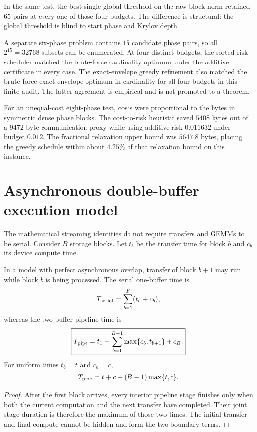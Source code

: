 In the same test, the best single global threshold on the raw block norm
retained $65$ pairs at every one of those four budgets.  The difference is
structural: the global threshold is blind to start phase and Krylov depth.

A separate six-phase problem contains $15$ candidate phase pairs, so all
$2^{15}=32768$ subsets can be enumerated.  At four distinct budgets, the
sorted-risk scheduler matched the brute-force cardinality optimum under the
additive certificate in every case.  The exact-envelope greedy refinement also
matched the brute-force exact-envelope optimum in cardinality for all four
budgets in this finite audit.  The latter agreement is empirical and is not
promoted to a theorem.

For an unequal-cost eight-phase test, costs were proportional to the bytes in
symmetric dense phase blocks.  The cost-to-risk heuristic saved $5408$ bytes
out of a $9472$-byte communication proxy while using additive risk $0.011632$
under budget $0.012$.  The fractional relaxation upper bound was $5647.8$
bytes, placing the greedy schedule within about $4.25\%$ of that relaxation
bound on this instance.


\section{Asynchronous double-buffer execution model}\label{sec:final-17}
\label{sec:double-buffer}

The mathematical streaming identities do not require transfers and GEMMs to be
serial.  Consider $B$ storage blocks.  Let $t_b$ be the transfer time for block
$b$ and $c_b$ its device compute time.

\begin{proposition}\label{claim:final-17-1}
In a model with perfect asynchronous overlap, transfer of block $b+1$ may run
while block $b$ is being processed.  The serial one-buffer time is
\[
T_{\rm serial}=\sum_{b=1}^{B}(t_b+c_b),
\]
whereas the two-buffer pipeline time is
\[
\boxed{
T_{\rm pipe}
=
t_1
+
\sum_{b=1}^{B-1}\max\{c_b,t_{b+1}\}
+
c_B.
}
\]
For uniform times $t_b=t$ and $c_b=c$,
\[
T_{\rm pipe}=t+c+(B-1)\max\{t,c\}.
\]
\end{proposition}

\begin{proof}
After the first block arrives, every interior pipeline stage finishes only when
both the current computation and the next transfer have completed.  Their
joint stage duration is therefore the maximum of those two times.  The initial
transfer and final compute cannot be hidden and form the two boundary terms.
\end{proof}

